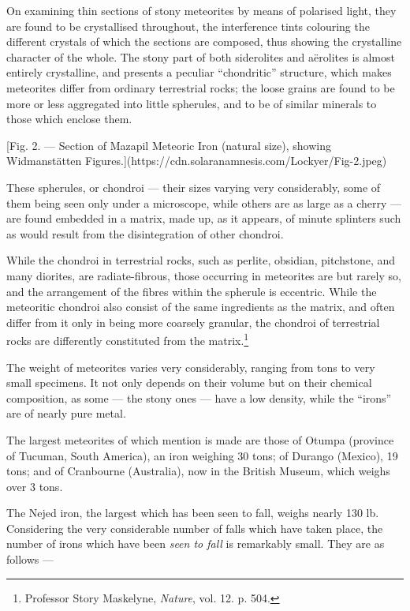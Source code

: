 \documentclass[a4paper, 12pt, oneside, polutonikogreek, english]{article}
\begin{document}
On examining thin sections of stony meteorites by means of polarised light, they are found to be crystallised throughout, the interference tints colouring the different crystals of which the sections are composed, thus showing the crystalline character of the whole. The stony part of both siderolites and aërolites is almost entirely crystalline, and presents a peculiar ``chondritic'' structure, which makes meteorites differ from ordinary terrestrial rocks; the loose grains are found to be more or less aggregated into little spherules, and to be of similar minerals to those which enclose them.

[Fig. 2. --- Section of Mazapil Meteoric Iron (natural size), showing Widmanstätten Figures.](https://cdn.solaranamnesis.com/Lockyer/Fig-2.jpeg)

These spherules, or chondroi --- their sizes varying very considerably, some of them being seen only under a microscope, while others are as large as a cherry --- are found embedded in a matrix, made up, as it appears, of minute splinters such as would result from the disintegration of other chondroi.

While the chondroi in terrestrial rocks, such as perlite, obsidian, pitchstone, and many diorites, are radiate-fibrous, those occurring in meteorites are but rarely so, and the arrangement of the fibres within the spherule is eccentric. While the meteoritic chondroi also consist of the same ingredients as the matrix, and often differ from it only in being more coarsely granular, the chondroi of terrestrial rocks are differently constituted from the matrix.\footnote{Professor Story Maskelyne, \emph{Nature}, vol. 12. p. 504.}

The weight of meteorites varies very considerably, ranging from tons to very small specimens. It not only depends on their volume but on their chemical composition, as some --- the stony ones --- have a low density, while the ``irons'' are of nearly pure metal.

The largest meteorites of which mention is made are those of Otumpa (province of Tucuman, South America), an iron weighing 30 tons; of Durango (Mexico), 19 tons; and of Cranbourne (Australia), now in the British Museum, which weighs over 3 tons.

The Nejed iron, the largest which has been seen to fall, weighs nearly 130 lb. Considering the very considerable number of falls which have taken place, the number of irons which have been \emph{seen to fall} is remarkably small. They are as follows ---
\end{document}
